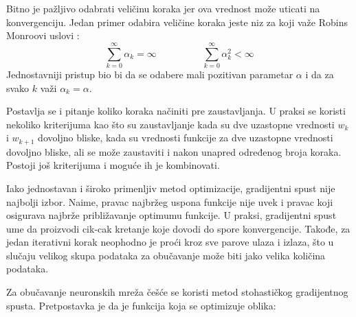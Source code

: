 Bitno je pažljivo odabrati veličinu koraka jer ova vrednost može uticati na konvergenciju. Jedan primer odabira veličine koraka jeste niz za koji važe Robins Monroovi uslovi \cite{nikolic_rm}:
\begin{equation}
	 \sum_{k=0}^{\infty} \alpha_k = \infty \hspace{2cm} \sum_{k=0}^{\infty} \alpha_k^2 < \infty 
	\end{equation}
Jednostavniji pristup bio bi da se odabere mali pozitivan parametar $\alpha$ i da za svako $k$ važi $\alpha_k = \alpha$.
\par
Postavlja se i pitanje koliko koraka načiniti pre zaustavljanja. U praksi se koristi nekoliko kriterijuma kao što su zaustavljanje kada su dve uzastopne vrednosti $w_k$ i $w_{k+1}$ dovoljno bliske, kada su vrednosti funkcije za dve uzastopne vrednosti dovoljno bliske, ali se može zaustaviti i nakon unapred određenog broja koraka. Postoji još kriterijuma i moguće ih je kombinovati.
\par
Iako jednostavan i široko primenljiv metod optimizacije, gradijentni spust nije najbolji izbor. Naime, pravac najbržeg uspona funkcije nije uvek i pravac koji osigurava najbrže približavanje optimumu funkcije. U praksi, gradijentni spust ume da proizvodi cik-cak kretanje koje dovodi do spore konvergencije. Takođe, za jedan iterativni korak neophodno je proći kroz sve parove ulaza i izlaza, što u slučaju velikog skupa podataka za obučavanje može biti jako velika količina podataka.
\par
Za obučavanje neuronskih mreža češće se koristi metod stohastičkog gradijentnog spusta. Pretpostavka je da je funkcija koja se optimizuje oblika:

